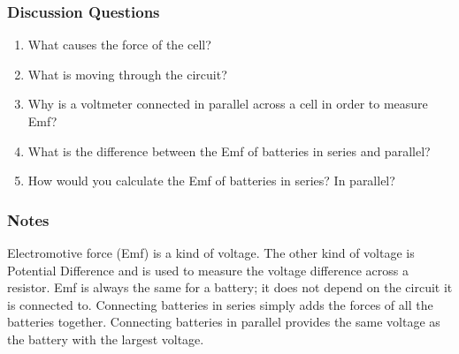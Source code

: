\subsubsection*{Discussion Questions}
\begin{enumerate}
\item{What causes the force of the cell?}
\item{What is moving through the circuit?}
\item{Why is a voltmeter connected in parallel across a cell in order to measure Emf?}
\item{What is the difference between the Emf of batteries in series and parallel?}
\item{How would you calculate the Emf of batteries in series? In parallel?}
\end{enumerate}

\subsubsection*{Notes}
Electromotive force (Emf) is a kind of voltage. The other kind of voltage is Potential Difference and is used to measure the voltage difference across a resistor. Emf is always the same for a battery; it does not depend on the circuit it is connected to. Connecting batteries in series simply adds the forces of all the batteries together. Connecting batteries in parallel provides the same voltage as the battery with the largest voltage.
